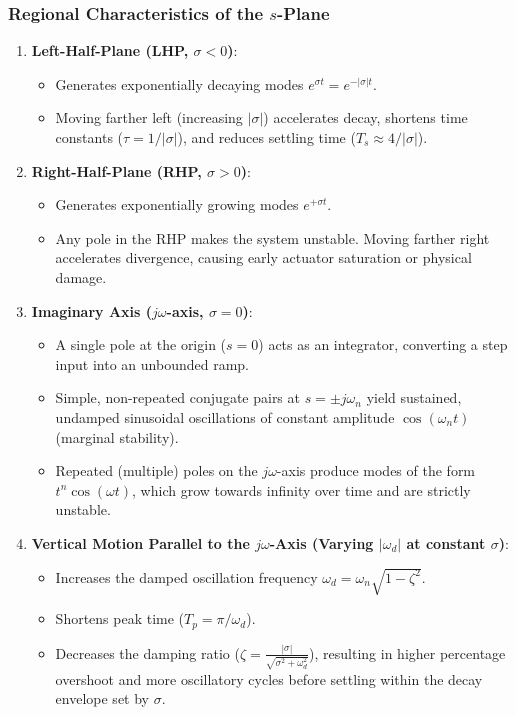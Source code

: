 \documentclass[12pt,onecolumn,twoside ]{article}
\begin{document}
	\subsubsection{Regional Characteristics of the $s$-Plane}
	\begin{enumerate}
		\item
		\textbf{Left-Half-Plane (LHP, $\sigma < 0$)}:
		\begin{itemize}
			\item
			Generates exponentially decaying modes $e^{\sigma t} = e^{-|\sigma|t}$.
			\item
			Moving farther left (increasing $|\sigma|$) accelerates decay, shortens time constants ($\tau = 1/|\sigma|$), and reduces settling time ($T_s \approx 4/|\sigma|$).
		\end{itemize}
		\item
		\textbf{Right-Half-Plane (RHP, $\sigma > 0$)}:
		\begin{itemize}
			\item
			Generates exponentially growing modes $e^{+\sigma t}$.
			\item
			Any pole in the RHP makes the system unstable. Moving farther right accelerates divergence, causing early actuator saturation or physical damage.
		\end{itemize}
		\item
		\textbf{Imaginary Axis ($j\omega$-axis, $\sigma = 0$)}:
		\begin{itemize}
			\item
			A single pole at the origin ($s = 0$) acts as an integrator, converting a step input into an unbounded ramp.
			\item
			Simple, non-repeated conjugate pairs at $s = \pm j\omega_n$ yield sustained, undamped sinusoidal oscillations of constant amplitude $\cos(\omega_n t)$ (marginal stability).
			\item
			Repeated (multiple) poles on the $j\omega$-axis produce modes of the form $t^n \cos(\omega t)$, which grow towards infinity over time and are strictly unstable.
		\end{itemize}
		\item
		\textbf{Vertical Motion Parallel to the $j\omega$-Axis (Varying $|\omega_d|$ at constant $\sigma$)}:
		\begin{itemize}
			\item
			Increases the damped oscillation frequency $\omega_d = \omega_n \sqrt{1 - \zeta^2}$.
			\item
			Shortens peak time ($T_p = \pi/\omega_d$).
			\item
			Decreases the damping ratio ($\zeta = \frac{|\sigma|}{\sqrt{\sigma^2 + \omega_d^2}}$), resulting in higher percentage overshoot and more oscillatory cycles before settling within the decay envelope set by $\sigma$.
		\end{itemize}
	\end{enumerate}
	
\end{document}
